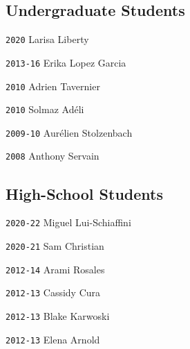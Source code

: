 \begin{multicols}{2}

\vspace{-1em}
\subsection*{Undergraduate Students}

\noindent \texttt{2020} \tab Larisa Liberty

\noindent \texttt{2013-16} \tab Erika Lopez Garcia

\noindent \texttt{2010} \tab Adrien Tavernier

\noindent \texttt{2010} \tab Solmaz Adéli

\noindent \texttt{2009-10} \tab Aurélien Stolzenbach

\noindent \texttt{2008} \tab Anthony Servain

\columnbreak
\vspace{-1em}
\subsection*{High-School Students}

\noindent \texttt{2020-22} \tab Miguel Lui-Schiaffini

\noindent \texttt{2020-21} \tab Sam Christian

\noindent \texttt{2012-14} \tab Arami Rosales

\noindent \texttt{2012-13} \tab Cassidy Cura

\noindent \texttt{2012-13} \tab Blake Karwoski

\noindent \texttt{2012-13} \tab Elena Arnold

\end{multicols}